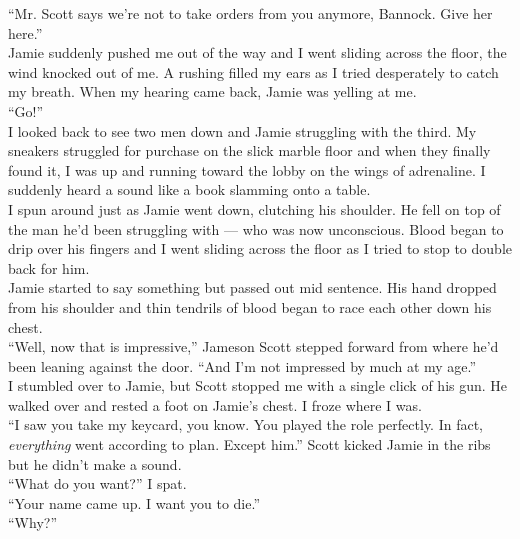 \documentclass[a5paper]{scrartcl}
\begin{document}
\enquote{Mr. Scott says we're not to take orders from you anymore, Bannock. Give her here.}\\


Jamie suddenly pushed me out of the way and I went sliding across the floor, the wind knocked out of me.  A rushing filled my ears as I tried desperately to catch my breath. When my hearing came back, Jamie was yelling at me.\\


\enquote{Go!}\\


I looked back to see two men down and Jamie struggling with the third. My sneakers struggled for purchase on the slick marble floor and when they finally found it, I was up and running toward the lobby on the wings of adrenaline. I suddenly heard a sound like a book slamming onto a table. \\


I spun around just as Jamie went down, clutching his shoulder. He fell on top of the man he'd been struggling with --- who was now unconscious.   Blood began to drip over his fingers and I went sliding across the floor as I tried to stop to double back for him. \\


Jamie started to say something but passed out mid sentence. His hand dropped from his shoulder and thin tendrils of blood began to race each other down his chest.\\


\enquote{Well, now that is impressive,} Jameson Scott stepped forward from where he'd been leaning against the door. \enquote{And I'm not impressed by much at my age.}\\


I stumbled over to Jamie, but Scott stopped me with a single click of his gun. He walked over and rested a foot on Jamie's chest. I froze where I was. \\


\enquote{I saw you take my keycard, you know. You played the role perfectly. In fact, \textit{everything}
 went according to plan. Except him.} Scott kicked Jamie in the ribs but he didn't make a sound.\\


\enquote{What do you want?} I spat.\\


\enquote{Your name came up. I want you to die.}\\


\enquote{Why?}\\
\end{document}
